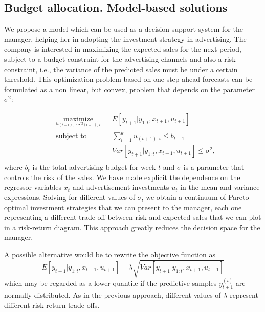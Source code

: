 

\subsection{Budget allocation. Model-based solutions}\label{section: budget allocation}

We propose a model which can be used as a decision support system for the manager, helping her in adopting the  investment strategy in advertising. The company is interested in maximizing the expected sales for the next period, subject to a budget constraint for the advertising channels and also a risk constraint, i.e., the variance of the predicted sales must be under a certain threshold.
This optimization problem based on one-step-ahead forecasts can be formulated as a non linear, but convex, problem that depends on the parameter $\sigma^2$:

\begin{equation*}
\begin{aligned}
& \underset{u_{(t+1),1}...u_{(t+1),k}}{\text{maximize}}
& &  E[ \bar{y}_{t+1} | y_{1:t}, x_{t+1}, u_{t+1}] \\
& \text{subject to}
& & \sum_{i=1}^k  u_{(t+1),i} \leq b_{t+1} \\
& & & Var[ \bar{y}_{t+1} | y_{1:t}, x_{t+1}, u_{t+1}] \leq \sigma^2, \\
\end{aligned}
\end{equation*}
where $b_t$ is the total advertising budget for week $t$ and $\sigma$ is a parameter that controls the risk of the sales. We have made explicit the dependence on the regressor variables $x_t$ and advertisement investments $u_t$ in the mean and variance expressions.
Solving for different values of $\sigma$, we obtain a continuum of Pareto optimal investment strategies that we can present to the manager, each one representing a different trade-off between risk and expected sales that we can plot in a risk-return diagram.
This approach greatly reduces the decision space for the manager.

A possible alternative would be to rewrite the objective function as 
$$E[ \bar{y}_{t+1} | y_{1:t}, x_{t+1}, u_{t+1}] - \lambda \sqrt{Var[ \bar{y}_{t+1} | y_{1:t}, x_{t+1}, u_{t+1}]}$$ 
which may be regarded as a lower quantile if the predictive samples $\bar{y}^{(i)}_{t+1}$ are normally distributed.
As in the previous approach, different values of $\lambda$ represent different risk-return trade-offs.

